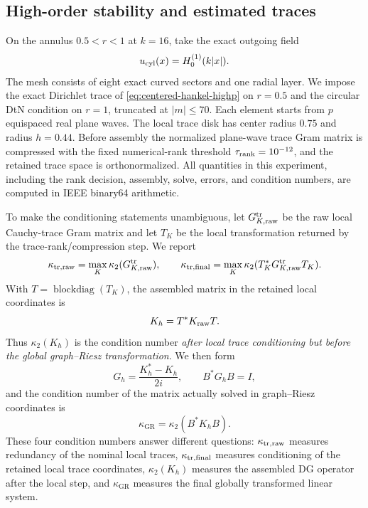 \documentclass[11pt]{article}
\newcommand{\ii}{i}
\newcommand{\GR}{\mathrm{GR}}
\numberwithin{equation}{section}
\begin{document}
\subsection{High-order stability and estimated traces}\label{sec:hankel-highp}
On the annulus $0.5<r<1$ at $k=16$, take the exact outgoing field
\begin{equation}\label{eq:centered-hankel-highp}
 u_{\rm cyl}(x)=H_0^{(1)}(k|x|).
\end{equation}
The mesh consists of eight exact curved sectors and one radial layer.  We impose the exact Dirichlet trace of \eqref{eq:centered-hankel-highp} on $r=0.5$ and the circular DtN condition on $r=1$, truncated at $|m|\le70$.  Each element starts from $p$ equispaced real plane waves.  The local trace disk has center radius $0.75$ and radius $h=0.44$.  Before assembly the normalized plane-wave trace Gram matrix is compressed with the fixed numerical-rank threshold $\tau_{\rm rank}=10^{-12}$, and the retained trace space is orthonormalized.  All quantities in this experiment, including the rank decision, assembly, solve, errors, and condition numbers, are computed in IEEE binary64 arithmetic.

To make the conditioning statements unambiguous, let $G^{\rm tr}_{K,\rm raw}$ be the raw local Cauchy-trace Gram matrix and let $T_K$ be the local transformation returned by the trace-rank/compression step.  We report
\[
 \kappa_{\rm tr,raw}=\max_K\kappa_2(G^{\rm tr}_{K,\rm raw}),
 \qquad
 \kappa_{\rm tr,final}=\max_K\kappa_2(T_K^*G^{\rm tr}_{K,\rm raw}T_K).
\]
With $T=\operatorname{blockdiag}(T_K)$, the assembled matrix in the retained local coordinates is
\[
 K_h=T^*K_{\rm raw}T.
\]
Thus $\kappa_2(K_h)$ is the condition number \emph{after local trace conditioning but before the global graph--Riesz transformation}.  We then form
\[
 G_h=\frac{K_h^*-K_h}{2\ii},\qquad B^*G_hB=I,
\]
and the condition number of the matrix actually solved in graph--Riesz coordinates is
\begin{equation}\label{eq:hankel-highp-kgr}
 \kappa_{\GR}=\kappa_2(B^*K_hB).
\end{equation}
These four condition numbers answer different questions: $\kappa_{\rm tr,raw}$ measures redundancy of the nominal local traces, $\kappa_{\rm tr,final}$ measures conditioning of the retained local trace coordinates, $\kappa_2(K_h)$ measures the assembled DG operator after the local step, and $\kappa_{\GR}$ measures the final globally transformed linear system.
\end{document}
